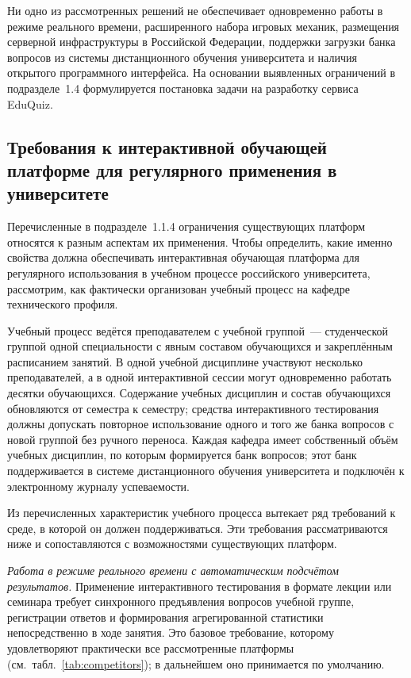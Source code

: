 Ни одно из рассмотренных решений не обеспечивает одновременно
работы в режиме реального времени, расширенного набора игровых
механик, размещения серверной инфраструктуры в Российской
Федерации, поддержки загрузки банка вопросов из системы
дистанционного обучения университета и наличия открытого
программного интерфейса. На основании выявленных
ограничений в подразделе~1.4 формулируется постановка задачи
на разработку сервиса EduQuiz.

\subsection{Требования к интерактивной обучающей платформе для регулярного применения в университете}

Перечисленные в подразделе~1.1.4 ограничения существующих платформ
относятся к разным аспектам их применения. Чтобы определить, какие
именно свойства должна обеспечивать интерактивная обучающая
платформа для регулярного использования в учебном процессе
российского университета, рассмотрим, как фактически
организован учебный процесс на кафедре технического профиля.

Учебный процесс ведётся преподавателем с учебной группой~---
студенческой группой одной специальности с явным составом
обучающихся и закреплённым расписанием занятий. В одной учебной
дисциплине участвуют несколько преподавателей, а в одной
интерактивной сессии могут одновременно работать десятки
обучающихся. Содержание учебных дисциплин и состав обучающихся
обновляются от семестра к семестру; средства интерактивного
тестирования должны допускать повторное использование одного и того
же банка вопросов с новой группой без ручного переноса. Каждая
кафедра имеет собственный объём учебных дисциплин, по которым
формируется банк вопросов; этот банк поддерживается в системе
дистанционного обучения университета и подключён к электронному
журналу успеваемости.

Из перечисленных характеристик учебного процесса вытекает ряд
требований к среде, в которой он должен поддерживаться. Эти
требования рассматриваются ниже и сопоставляются с возможностями
существующих платформ.

\emph{Работа в режиме реального времени с автоматическим подсчётом
результатов.} Применение интерактивного тестирования в формате
лекции или семинара требует синхронного предъявления вопросов
учебной группе, регистрации ответов и формирования агрегированной
статистики непосредственно в ходе занятия. Это базовое требование,
которому удовлетворяют практически все рассмотренные платформы
(см.~табл.~\ref{tab:competitors}); в дальнейшем оно принимается
по умолчанию.

